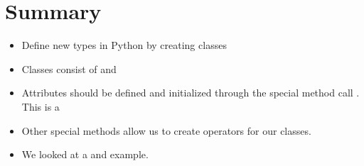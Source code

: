 \documentclass[letterpaper,10pt,english]{sphinxmanual}
\begin{document}
\section{Summary}
\label{\detokenize{lecture_notes/lec18_classes1:summary}}\begin{itemize}
\item {} 
Define new types in Python by creating classes

\item {} 
Classes consist of  and 

\item {} 
Attributes should be defined and initialized through the special
method call . This is a 

\item {} 
Other special methods allow us to create operators for our classes.

\item {} 
We looked at a  and  example.

\end{itemize}
\end{document}
